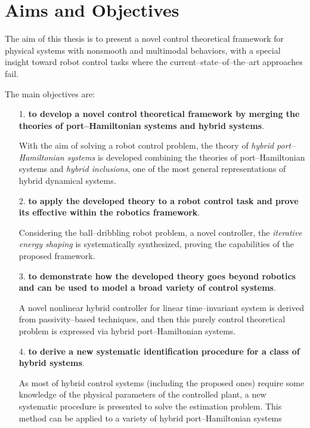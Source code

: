 \section{{Aims and Objectives}}\label{sec:aim}
The aim of this thesis is to present a novel control theoretical framework for physical systems with nonsmooth and multimodal behaviors, with a special insight toward robot control tasks where the current--state--of--the--art approaches fail.

The main objectives are:
%
\begin{itemize}
    \item [1.] \textbf{to develop a novel control theoretical framework by merging the theories of port--Hamiltonian systems and hybrid systems}.
    
    With the aim of solving a robot control problem, the theory of \textit{hybrid port--Hamiltonian systems} is developed combining the theories of port--Hamiltonian systems and \textit{hybrid inclusions}, one of the most general representations of hybrid dynamical systems.
    \newline
    \item [2.] \textbf{to apply the developed theory to a robot control task and prove its effective within the robotics framework}. 
    
    Considering the ball--dribbling robot problem, a novel controller, the \textit{iterative energy shaping} is systematically synthesized, proving the capabilities of the proposed framework.
    \newline
    \item [3.] \textbf{to demonstrate how the developed theory goes beyond robotics and can be used to model a broad variety of control systems}. 
    
    A novel nonlinear hybrid controller for linear time--invariant system is derived from passivity--based techniques, and then this purely control theoretical problem is expressed via hybrid port--Hamiltonian systems.
    \newline
    \item[4.] \textbf{to derive a new systematic identification procedure for a class of hybrid systems}.
    
    As most of hybrid control systems (including the proposed ones) require some knowledge of the physical parameters of the controlled plant, a new systematic procedure is presented to solve the estimation problem. This method can be applied to a variety of hybrid port--Hamiltonian systems 
    
    \end{itemize}
%





